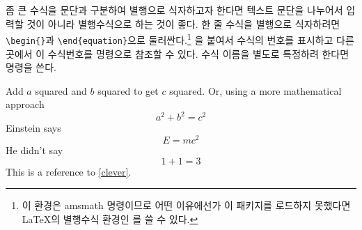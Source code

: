 좀 큰 수식을 문단과 구분하여 별행으로 식자하고자 한다면 텍스트 문단을 나누어서 입력할 것이 아니라 
별행수식으로 하는 것이 좋다.
한 줄 수식을 별행으로 식자하려면 \verb|\begin{|\verb|}|과 \verb|\end{equation}|으로 둘러싼다.\footnote{%
  이 환경은 \textsf{amsmath} 명령이므로 어떤 이유에선가 이 패키지를 로드하지 못했다면
  \LaTeX 의 별행수식 환경인 를 쓸 수 있다.
}
을 붙여서 수식의 번호를 표시하고 다른 곳에서 이 수식번호를  명령으로 참조할 수 있다. 
수식 이름을 별도로 특정하려 한다면  명령을 쓴다.
\begin{example}
Add $a$ squared and $b$ squared
to get $c$ squared. Or, using
a more mathematical approach
 \begin{equation}
   a^2 + b^2 = c^2
 \end{equation}
Einstein says
 \begin{equation}
   E = mc^2 \label{clever}
 \end{equation}
He didn't say
 \begin{equation}
  1 + 1 = 3 \tag{dumb}
 \end{equation}
This is a reference to 
\eqref{clever}. 
\end{example}



